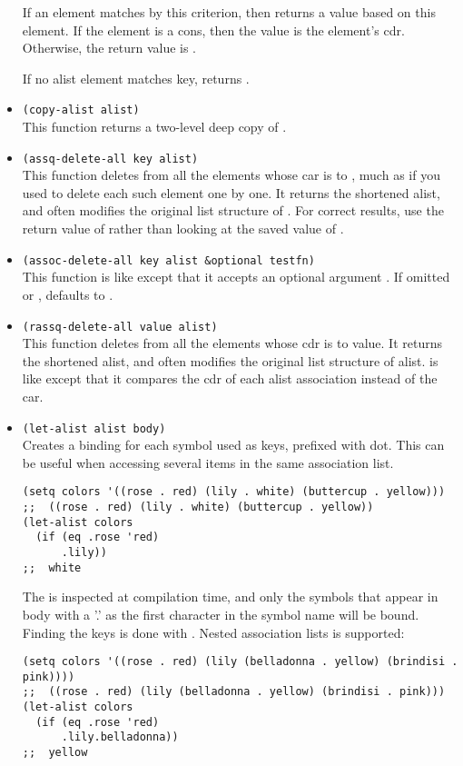 \begin{itemize}
  If an  element matches  by this criterion, then  returns a value based on this element.
  If the element is a cons, then the value is the element’s cdr.
  Otherwise, the return value is .
  
  If no alist element matches key,  returns .
\item \lstinline|(copy-alist alist)|\\
  This function returns a two-level deep copy of .
\item \lstinline|(assq-delete-all key alist)|\\
  This function deletes from  all the elements whose car is  to , much as if you used  to delete each such element one by one.
  It returns the shortened alist, and often modifies the original list structure of .
  For correct results, use the return value of  rather than looking at the saved value of .
\item \lstinline|(assoc-delete-all key alist &optional testfn)|\\
  This function is like  except that it accepts an optional argument .
  If omitted or ,  defaults to . 
\item \lstinline|(rassq-delete-all value alist)|\\
  This function deletes from  all the elements whose cdr is  to value.
  It returns the shortened alist, and often modifies the original list structure of alist.
   is like  except that it compares the cdr of each alist association instead of the car.
\item \lstinline|(let-alist alist body)|\\
  Creates a binding for each symbol used as keys, prefixed with dot.
  This can be useful when accessing several items in the same association list.
\begin{lstlisting}
(setq colors '((rose . red) (lily . white) (buttercup . yellow)))
;;  ((rose . red) (lily . white) (buttercup . yellow))
(let-alist colors
  (if (eq .rose 'red)
      .lily))
;;  white
\end{lstlisting}
  The  is inspected at compilation time, and only the symbols that appear in body with a '.' as the first character in the symbol name will be bound.
  Finding the keys is done with .
  Nested association lists is supported:
\begin{lstlisting}
(setq colors '((rose . red) (lily (belladonna . yellow) (brindisi . pink))))
;;  ((rose . red) (lily (belladonna . yellow) (brindisi . pink)))
(let-alist colors
  (if (eq .rose 'red)
      .lily.belladonna))
;;  yellow
\end{lstlisting}
\end{itemize}

